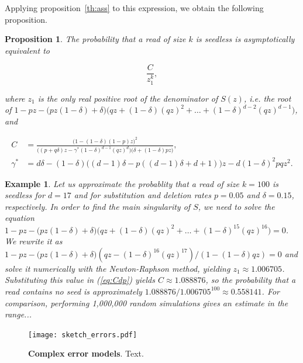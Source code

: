 \documentclass{article}
\newtheorem{example}{Example}
\newtheorem{proposition}{Proposition}
\begin{document}
Applying proposition~\ref{th:ass} to this expression, we obtain the
following proposition.

\begin{proposition}
The probability that a read of size $k$ is seedless is asymptotically
equivalent to

\begin{equation*}
\frac{C}{z_1^k},
\end{equation*}

\noindent
where $z_1$ is the only real positive root of the denominator of $S(z)$,
\textit{i.e.} the root of $1-pz - \big(pz(1-\delta) +
\delta\big)\big(qz+(1-\delta)(qz)^2 + \ldots +
(1-\delta)^{d-2}(qz)^{d-1}\big)$, and

\begin{equation}
\label{eq:Cdp}
\begin{split}
C &=
\frac{ \big(1-(1-\delta)(1-p)z\big)^2 }
{ \big((p+q\delta)z  -\gamma^*(1-\delta)^{d-1}(qz)^d \big)
\big(\delta+(1-\delta)pz\big) }, \\
\gamma^* &= d\delta -(1-\delta)\big((d-1)\delta-p((d-1)\delta+d+1)\big)z
- d(1-\delta)^2pqz^2.
\end{split}
\end{equation}

\end{proposition}

\begin{example}
Let us approximate the probablity that a read of size $k = 100$ is
seedless for $d=17$ and for substitution and deletion rates $p = 0.05$ and
$\delta = 0.15$, respectively. In order to find the main singularity of
$S$, we need to solve the equation $1-pz - \big(pz(1-\delta) +
\delta\big)\big(qz+(1-\delta)(qz)^2 + \ldots +
(1-\delta)^{15}(qz)^{16}\big) = 0$. We rewrite it as $1-pz -
\big(pz(1-\delta)+\delta\big)(qz-(1-\delta)^{16}(qz)^{17}) /
(1-(1-\delta)qz) = 0$ and solve it numerically with the Newton-Raphson
method, yielding $z_1 \approx 1.006705$. Substituting this value in
(\ref{eq:Cdp}) yields $C \approx 1.088876$, so the probability that a read
contains no seed is approximately $1.088876 / 1.006705^{100} \approx
0.558141$. For comparison, performing 1,000,000 random simulations gives
an estimate in the range...
\end{example}


\begin{figure}[h]
\centering
\texttt{[image: sketch\_errors.pdf]}
\caption{\textbf{Complex error models}.
Text.
}
\label{fig:sketcherr}
\end{figure}
\end{document}
